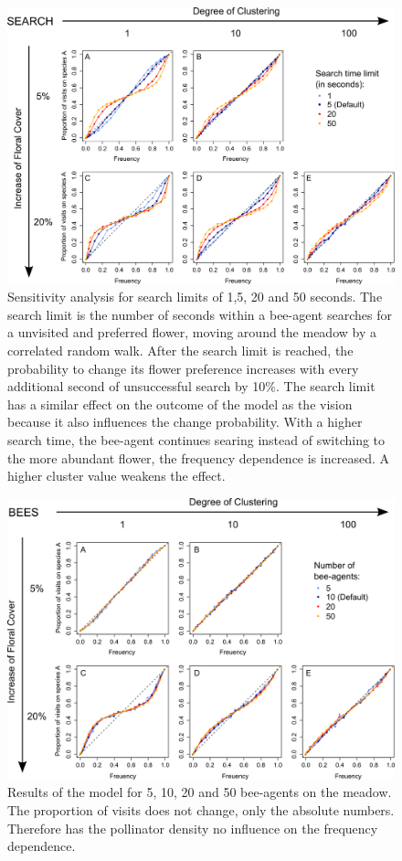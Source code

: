 \clearpage


\begin{figure} [!h] 
	\centering
	\includegraphics[width=14cm]{Images/SA_flight}
	\caption{Sensitivity analysis for search limits of 1,5, 20 and 50 seconds. The search limit is the number of seconds within a bee-agent searches for a unvisited and preferred flower, moving around the meadow by a correlated random walk. After the search limit is reached, the probability to change its flower preference increases with every additional second of unsuccessful search by 10\%. The search limit has a similar effect on the outcome of the model as the vision because it also influences the change probability. With a higher search time, the bee-agent continues searing instead of switching to the more abundant flower, the frequency dependence is increased. A higher cluster value weakens the effect.}
	\label{fig:SA_flight}
\end{figure}

\clearpage

\begin{figure} [!h]
	\centering
	\includegraphics[width=14cm]{Images/SA_bees}
	\caption{Results of the model for 5, 10, 20 and 50 bee-agents on the meadow. The proportion of visits does not change, only the absolute numbers. Therefore has the pollinator density no influence on the frequency dependence.}
	\label{fig:SA_bees}
\end{figure}


